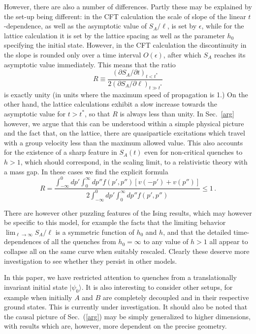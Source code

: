 \documentclass[12pt,preprint,tighten,eqsecnum,aps,floats,psfig,epsfig,amsmath,onecolumn]{revtex4-1}
\def\be{\begin{equation}}
\def\ee{\end{equation}}
\def\e{\epsilon}
\begin{document}
However, there are also a number of differences. Partly these may be
explained by
the set-up being different: in the CFT calculation the scale of
slope of the linear $t$-dependence, as well as the asymptotic value of
$S_A/\ell$, is set by $\e$, while for the lattice calculation it is set
by the lattice spacing as well as the parameter $h_0$ specifying the
initial state. However, in the CFT calculation the discontinuity in the
slope is rounded only over a time interval $O(\e)$, after which $S_A$
reaches its asymptotic value immediately. This means that the ratio
\begin{equation}
R\equiv\frac{(\partial S_A/\partial t)_{t<t^*}}{2
(\partial S_A/\partial\ell)_{t\gg t^*}}
\end{equation}
is exactly unity (in units where the maximum speed of propagation is 1.)
On the other hand, the lattice calculations exhibit a slow increase
towards the asymptotic value for $t>t^*$, so that $R$ is always less
than unity. In Sec.~\ref{arg} however, we argue that this can be
understood within a simple physical picture and the fact that, on the
lattice, there are quasiparticle excitations which travel with a group
velocity less than the maximum allowed value. This also accounts for the
existence of a sharp feature in $S_A(t)$ even for non-critical quenches
to $h>1$, which should correspond, in the scaling limit, to a 
relativistic theory with a mass gap.
In these cases we find the explicit formula 
\be
R= \frac{\int_{-\infty}^0 dp' \int_0^\infty dp'' f(p',p'')[v(-p')+v(p'')]}{
2\int_{-\infty}^0 dp' \int_0^\infty dp'' f(p',p'')}\leq 1\,.
\ee

There are however other puzzling features of the Ising results, which may
however be specific to this model, for example the facts that the
limiting behavior $\lim_{\ell\to\infty}S_A/\ell$ is a symmetric
function of $h_0$ and $h$, and that the detailed time-dependences of all the
quenches from $h_0=\infty$ to any value of $h>1$ all appear to collapse
all on the same curve when suitably rescaled. Clearly these 
deserve more investigation to see whether they persist in other models.

In this paper, we have restricted attention to quenches from a
translationally invariant initial state $|\psi_0\rangle$. It is also
interesting to consider other setups, for example when initially $A$ and
$B$ are completely decoupled and in their respective ground states. This
is currently under investigation. It should also be noted that the
causal picture of Sec.~(\ref{arg}) may be simply generalized to higher
dimensions, with results which are, however, more dependent on the
precise geometry.
\end{document}

